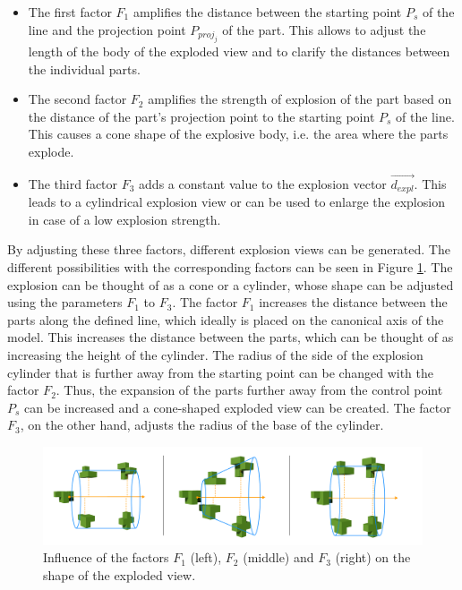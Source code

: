\begin{itemize}
	\item The first factor $F_1$ amplifies the distance between the starting point $P_s$ of the line and the projection point $P_{proj_j}$ of the part. 
	This allows to adjust the length of the body of the exploded view and to clarify the distances between the individual parts.  
	\item The second factor $F_2$ amplifies the strength of explosion of the part based on the distance of the part's projection point to the starting point $P_s$ of the line. 
	This causes a cone shape of the explosive body, i.e. the area where the parts explode.
	\item The third factor $F_3$ adds a constant value to the explosion vector $\vec{d_{expl}}$. 
	This leads to a cylindrical explosion view or can be used to enlarge the explosion in case of a low explosion strength.  
\end{itemize}
By adjusting these three factors, different explosion views can be generated. The different possibilities with the corresponding factors can be seen in Figure \ref{fig:LineExplosionFactors}.
The explosion can be thought of as a cone or a cylinder, whose shape can be adjusted using the parameters $F_1$ to $F_3$.
The factor $F_1$ increases the distance between the parts along the defined line, which ideally is placed on the canonical axis of the model. This increases the distance between the parts, which can be thought of as increasing the height of the cylinder.
The radius of the side of the explosion cylinder that is further away from the starting point can be changed with the factor $F_2$. Thus, the expansion of the parts further away from the control point $P_s$ can be increased and a cone-shaped exploded view can be created. 
The factor $F_3$, on the other hand, adjusts the radius of the base of the cylinder. %
\begin{figure}[h]
	\centering
	\includegraphics[width=.9\linewidth]{fig/Images/LineExplosionFactors}
	\caption[]{Influence of the factors $F_1$ (left), $F_2$ (middle) and $F_3$ (right) on the shape of the exploded view.}
	\label{fig:LineExplosionFactors}
\end{figure}
